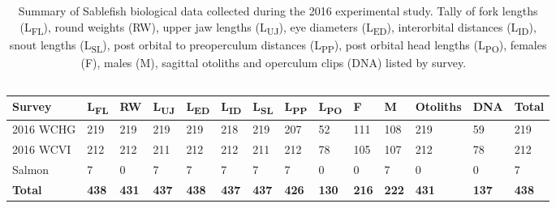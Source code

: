 \documentclass[12pt]{article}\usepackage[]{graphicx}\usepackage[]{color}
\begin{document}
\begin{table}[!h]

\caption{\label{tab:table2}Summary of Sablefish biological data collected during the 2016 experimental study. Tally of fork lengths (L\textsubscript{FL}), round weights (RW), upper jaw lengths (L\textsubscript{UJ}), eye diameters (L\textsubscript{ED}), interorbital distances (L\textsubscript{ID}), snout lengths (L\textsubscript{SL}), post orbital to preoperculum distances (L\textsubscript{PP}), post orbital head lengths (L\textsubscript{PO}), females (F), males (M), sagittal otoliths and operculum clips (DNA) listed by survey. ~\\
\hspace*{0.333em}\\}
\fontsize{10}{12}\selectfont
\begin{tabular}[t]{llllllllllllll}
\toprule
\textbf{Survey} & \textbf{L\textsubscript{FL}} & \textbf{RW} & \textbf{L\textsubscript{UJ}} & \textbf{L\textsubscript{ED}} & \textbf{L\textsubscript{ID}} & \textbf{L\textsubscript{SL}} & \textbf{L\textsubscript{PP}} & \textbf{L\textsubscript{PO}} & \textbf{F} & \textbf{M} & \textbf{Otoliths} & \textbf{DNA} & \textbf{Total}\\
\midrule
2016 WCHG & 219 & 219 & 219 & 219 & 218 & 219 & 207 & 52 & 111 & 108 & 219 & 59 & 219\\
2016 WCVI & 212 & 212 & 211 & 212 & 212 & 211 & 212 & 78 & 105 & 107 & 212 & 78 & 212\\
Salmon & 7 & 0 & 7 & 7 & 7 & 7 & 7 & 0 & 0 & 7 & 0 & 0 & 7\\
\midrule
\textbf{Total} & \textbf{438} & \textbf{431} & \textbf{437} & \textbf{438} & \textbf{437} & \textbf{437} & \textbf{426} & \textbf{130} & \textbf{216} & \textbf{222} & \textbf{431} & \textbf{137} & \textbf{438}\\
\bottomrule
\end{tabular}
\end{table}
~\\
\hspace*{0.333em}\\
\hspace*{0.333em}\\
\end{document}
